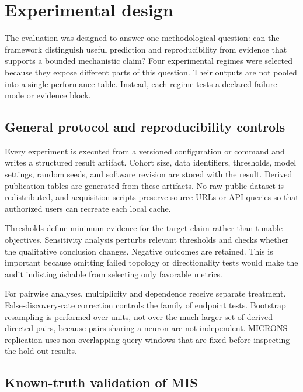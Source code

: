\section{Experimental design}
\label{sec:experimental-design}

The evaluation was designed to answer one methodological question: can the
framework distinguish useful prediction and reproducibility from evidence that
supports a bounded mechanistic claim? Four experimental regimes were selected
because they expose different parts of this question. Their outputs are not
pooled into a single performance table. Instead, each regime tests a declared
failure mode or evidence block.

\subsection{General protocol and reproducibility controls}
\label{subsec:general-protocol}

Every experiment is executed from a versioned configuration or command and
writes a structured result artifact. Cohort size, data identifiers, thresholds,
model settings, random seeds, and software revision are stored with the result.
Derived publication tables are generated from these artifacts. No raw public
dataset is redistributed, and acquisition scripts preserve source URLs or API
queries so that authorized users can recreate each local cache.

Thresholds define minimum evidence for the target claim rather than tunable
objectives. Sensitivity analysis perturbs relevant thresholds and checks whether
the qualitative conclusion changes. Negative outcomes are retained. This is
important because omitting failed topology or directionality tests would make
the audit indistinguishable from selecting only favorable metrics.

For pairwise analyses, multiplicity and dependence receive separate treatment.
False-discovery-rate correction controls the family of endpoint tests. Bootstrap
resampling is performed over units, not over the much larger set of derived
directed pairs, because pairs sharing a neuron are not independent. MICRONS
replication uses non-overlapping query windows that are fixed before inspecting
the hold-out results.

\subsection{Known-truth validation of MIS}
\label{subsec:known-truth-mis}

